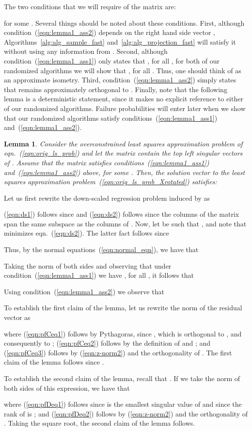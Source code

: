 \documentclass[11pt]{article}
\newtheorem{lemma}{Lemma}
\newenvironment{Proof}{\noindent {\em Proof:}}{\\\hspace*{\fill}\mbox{}}
\begin{document}
The two conditions that we will require of the matrix  are:

for some . Several things should be noted about these conditions. First, although condition~(\ref{eqn:lemma1_ass2}) depends on the right hand side vector , Algorithms~\ref{alg:alg_sample_fast} and~\ref{alg:alg_projection_fast} will satisfy it without using any information from . Second, although condition~(\ref{eqn:lemma1_ass1}) only states that , for all , for both of our randomized algorithms we will show that , for all . Thus, one should think of  as an approximate isometry. Third, condition~(\ref{eqn:lemma1_ass2}) simply states that  remains approximately orthogonal to . Finally, note that the following lemma is a deterministic statement, since it makes no explicit reference to either of our randomized algorithms. Failure probabilities will enter later when we show that our randomized algorithms satisfy conditions~(\ref{eqn:lemma1_ass1}) and~(\ref{eqn:lemma1_ass2}).

\begin{lemma} \label{lem:suff_cond}
Consider the overconstrained least squares approximation problem of eqn.~(\ref{eqn:orig_ls_prob}) and let the matrix  contain the top  left singular vectors of . Assume that the matrix  satisfies conditions~(\ref{eqn:lemma1_ass1}) and~(\ref{eqn:lemma1_ass2}) above, for some . Then, the solution vector  to the least squares approximation
problem~(\ref{eqn:orig_ls_prob_Xrotated}) satisfies:

\end{lemma}
\begin{Proof}
Let us first rewrite the down-scaled regression problem induced by
 as

(\ref{eqn:ds1}) follows since  and (\ref{eqn:ds2}) follows since the columns of the matrix  span the same subspace as the columns of . Now, let   be such that , and note that  minimizes eqn.~(\ref{eqn:ds2}). The latter fact follows since

Thus, by the normal equations~(\ref{eqn:normal_eqn}), we have that

Taking the norm of both sides and observing that under condition~(\ref{eqn:lemma1_ass1}) we have , for all , it follows that

Using condition~(\ref{eqn:lemma1_ass2}) we observe that


\noindent To establish the first claim of the lemma, let us rewrite
the norm of the residual vector as

where (\ref{eqn:pfCeq1}) follows by Pythagoras, since , which is orthogonal to , and consequently to
; (\ref{eqn:pfCeq2}) follows
by the definition of  and ; and (\ref{eqn:pfCeq3})
follows by (\ref{eqn:z-norm2}) and the orthogonality of . The first claim of the lemma follows since
.

To establish the second claim of the lemma, recall that . If we take the norm of both sides of this expression, we have that

where (\ref{eqn:pfDeq1}) follows since  is the
smallest singular value of  and since the rank of  is
; and (\ref{eqn:pfDeq2}) follows by
(\ref{eqn:z-norm2}) and the orthogonality of . Taking the square root, the second claim of the
lemma follows.
\end{Proof}
\end{document}
